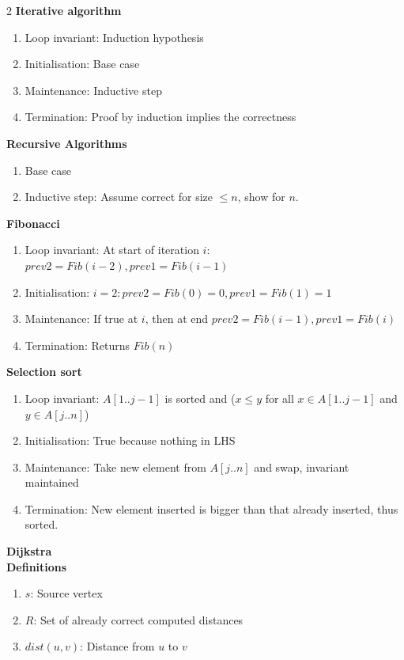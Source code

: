 \documentclass[10pt,landscape]{article}
\begin{document}
\begin{multicols*}{2}
\textbf{Iterative algorithm}
\begin{enumerate}
    \item Loop invariant: Induction hypothesis
    \item Initialisation: Base case
    \item Maintenance: Inductive step
    \item Termination: Proof by induction implies the correctness
\end{enumerate}
\vspace{8pt}
\textbf{Recursive Algorithms}
\begin{enumerate}
    \item Base case
    \item Inductive step: Assume correct for size $\leq n$, show for $n$.
\end{enumerate}
\vspace{8pt}
\textbf{Fibonacci}
\begin{enumerate}
    \item Loop invariant: At start of iteration $i$: $prev2 = Fib(i - 2), prev1 = Fib(i - 1)$
    \item Initialisation: $i = 2: prev2 = Fib(0) = 0, prev1 = Fib(1) = 1$
    \item Maintenance: If true at $i$, then at end $prev2 = Fib(i - 1), prev1 = Fib(i)$
    \item Termination: Returns $Fib(n)$
\end{enumerate}
\vspace{8pt}
\textbf{Selection sort}
\begin{enumerate}
    \item Loop invariant: $A[1..j-1]$ is sorted and ($x \leq y$ for all $x \in A[1..j-1]$ and $y \in A[j..n]$)
    \item Initialisation: True because nothing in LHS
    \item Maintenance: Take new element from $A[j..n]$ and swap, invariant maintained
    \item Termination: New element inserted is bigger than that already inserted, thus sorted.
\end{enumerate}
\vspace{8pt}
\textbf{Dijkstra} \\
\textbf{Definitions}
\begin{enumerate}
    \item $s$: Source vertex
    \item $R$: Set of already correct computed distances
    \item $dist(u, v)$: Distance from $u$ to $v$

\end{enumerate}
\end{multicols*}
\end{document}
